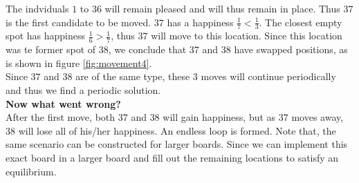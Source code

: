 The indviduals \(1\) to \(36\) will remain pleased and will thus remain in place. 
Thus $37$ is the first candidate to be moved. $37$ has a happiness $\frac{1}{7} < \frac{1}{3}$. 
The closest empty spot has happiness $\frac{1}{6} > \frac{1}{7}$, thus $37$ will move to this location. 
Since this location was te former spot of \(38\), we conclude that  $37$ and $38$ have swapped positions, as is shown in figure \ref{fig:movement4}.\\
Since $37$ and $38$ are of the same type, these $3$ moves will continue periodically and thus we find a periodic solution.\\

\textbf{Now what went wrong?} \\
After the first move, both $37$ and $38$ will gain happiness, but as \(37\) moves away, $38$ will lose all of his/her happiness. 
An endless loop is formed.
Note that, the same scenario can be constructed for larger boards. 
Since we can implement this exact board in a larger board and fill out the remaining locations to satisfy an equilibrium.
